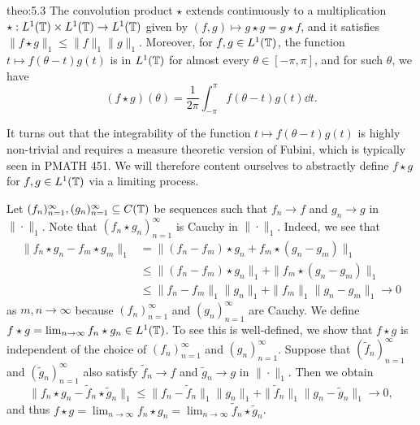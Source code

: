 \begin{theo}{theo:5.3}
    The convolution product $\star$ extends continuously to a multiplication 
    $\star : L^1(\mathbb{T}) \times L^1(\mathbb{T}) \to L^1(\mathbb{T})$ given by $(f, g) \mapsto 
    g \star g = g \star f$, and it satisfies $\|f \star g\|_1 \leq \|f\|_1 \|g\|_1$. 
    Moreover, for $f, g \in L^1(\mathbb{T})$, the function $t \mapsto f(\theta - t) g(t)$
    is in $L^1(\mathbb{T})$ for almost every $\theta \in [-\pi, \pi]$, and for such 
    $\theta$, we have 
    \[ (f \star g)(\theta) = \frac{1}{2\pi} \int_{-\pi}^\pi f(\theta - t)g(t)\dd t. \] 
\end{theo}
\begin{pf}
    It turns out that the integrability of the function $t \mapsto f(\theta - t) g(t)$ 
    is highly non-trivial and requires a measure theoretic version of 
    Fubini, which is typically seen in PMATH 451. We will therefore 
    content ourselves to abstractly define $f \star g$ for 
    $f, g \in L^1(\mathbb{T})$ via a limiting process. 

    Let $(f_n)_{n=1}^\infty, (g_n)_{n=1}^\infty \subseteq C(\mathbb{T})$ 
    be sequences such that $f_n \to f$ and $g_n \to g$ in $\|\cdot\|_1$. 
    Note that $(f_n \star g_n)_{n=1}^\infty$ is Cauchy in $\|\cdot\|_1$. 
    Indeed, we see that  
    \begin{align*}
        \|f_n \star g_n - f_m \star g_m\|_1 
        &= \|(f_n - f_m) \star g_n + f_m \star (g_n - g_m)\|_1 \\ 
        &\leq \|(f_n - f_m) \star g_n\|_1 + \|f_m \star (g_n - g_m)\|_1 \\ 
        &\leq \|f_n - f_m\|_1 \|g_n\|_1 + \|f_m\|_1 \|g_n - g_m\|_1 \to 0 
    \end{align*}
    as $m, n \to \infty$ because $(f_n)_{n=1}^\infty$ and $(g_n)_{n=1}^\infty$ 
    are Cauchy. We define $f \star g = \lim_{n\to\infty} 
    f_n \star g_n \in L^1(\mathbb{T})$. To see this is well-defined, we show that 
    $f \star g$ is independent of the choice of $(f_n)_{n=1}^\infty$ 
    and $(g_n)_{n=1}^\infty$. Suppose that $(\tilde f_n)_{n=1}^\infty$ 
    and $(\tilde g_n)_{n=1}^\infty$ also satisfy $\tilde f_n \to f$ and 
    $\tilde g_n \to g$ in $\|\cdot\|_1$. Then we obtain 
    \[ \|f_n \star g_n - \tilde f_n \star \tilde g_n\|_1 
    \leq \|f_n - \tilde f_n\|_1 \|g_n\|_1 + \|\tilde f_n\|_1 
    \|g_n - \tilde g_n\|_1 \to 0, \] 
    and thus $f \star g = \lim_{n\to\infty} f_n \star g_n = 
    \lim_{n\to\infty} \tilde f_n \star \tilde g_n$. 
\end{pf}

